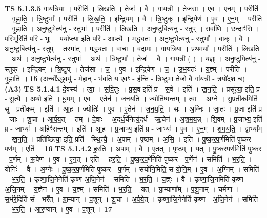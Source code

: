 \documentclass[17pt]{extarticle}
\begin{document}
                  \newline
                                \textbf{ TS 5.1.3.5} \newline
                  गा॒य॒त्रि॒या । परीति॑ । लि॒ख॒ति॒ । तेजः॑ । वै । गा॒य॒त्री । तेज॑सा । ए॒व । ए॒न॒म् । परीति॑ । गृ॒ह्णा॒ति॒ । त्रि॒ष्टुभा᳚ । परीति॑ । लि॒ख॒ति॒ । इ॒न्द्रि॒यम् । वै । त्रि॒ष्टुक् । इ॒न्द्रि॒येण॑ । ए॒व । ए॒न॒म् । परीति॑ । गृ॒ह्णा॒ति॒ । अ॒नु॒ष्टुभेत्य॑नु - स्तुभा᳚ । परीति॑ । लि॒ख॒ति॒ । अ॒नु॒ष्टुबित्य॑नु - स्तुप् । सर्वा॑णि । छन्दाꣳ॑सि । प॒रि॒भूरिति॑ परि - भूः । पर्या᳚प्त्या॒ इति॒ परि॑ - आ॒प्त्यै॒ । म॒द्ध्य॒तः । अ॒नु॒ष्टुभेत्य॑नु - स्तुभा᳚ । वाक् । वै । अ॒नु॒ष्टुबित्य॑नु - स्तुप् । तस्मा᳚त् । म॒द्ध्य॒तः । वा॒चा । व॒दा॒मः॒ । गा॒य॒त्रि॒या । प्र॒थ॒मया᳚ । परीति॑ । लि॒ख॒ति॒ । अथ॑ । अ॒नु॒ष्टुभेत्य॑नु - स्तुभा᳚ । अथ॑ । त्रि॒ष्टुभा᳚ । तेजः॑ । वै । गा॒य॒त्री ( ) । य॒ज्ञ्ः । अ॒नु॒ष्टुगित्य॑नु - स्तुक् । इ॒न्द्रि॒यम् । त्रि॒ष्टुप् । तेज॑सा । च॒ । ए॒व । इ॒न्द्रि॒येण॑ । च॒ । उ॒भ॒यतः॑ । य॒ज्ञ्म् । परीति॑ । गृ॒ह्णा॒ति॒ ॥ \textbf{  15 } \newline
                  \newline
                      (अ॒न्धो᳚ऽद्ध्व॒र्यु - र्म॒हान् - भ॑वति॒ य ए॒वꣳ - ह॑न्ति - त्रि॒ष्टुभा॒ तेजो॒ वै गा॑य॒त्री - त्रयो॑दश च)  \textbf{(A3)} \newline \newline
                                \textbf{ TS 5.1.4.1} \newline
                  दे॒वस्य॑ । त्वा॒ । स॒वि॒तुः । प्र॒स॒व इति॑ प्र - स॒वे । इति॑ । ख॒न॒ति॒ । प्रसू᳚त्या॒ इति॒ प्र - सू॒त्यै॒ । अथो॒ इति॑ । धू॒मम् । ए॒व । ए॒तेन॑ । ज॒न॒य॒ति॒ । ज्योति॑ष्मन्तम् । त्वा॒ । अ॒ग्ने॒ । सु॒प्रती॑क॒मिति॑ सु - प्रती॑कम् । इति॑ । आ॒ह॒ । ज्योतिः॑ । ए॒व । ए॒तेन॑ । ज॒न॒य॒ति॒ । सः । अ॒ग्निः । जा॒तः । प्र॒जा इति॑ प्र - जाः । शु॒चा । आ॒र्प॒य॒त् । तम् । दे॒वाः । अ॒द्‌र्ध॒र्चेनेत्य॒॑द्‌र्ध - ऋ॒चेन॑ । अ॒श॒म॒य॒न्न् । शि॒वम् । प्र॒जाभ्य॒ इति॑ प्र - जाभ्यः॑ । अहिꣳ॑सन्तम् । इति॑ । आ॒ह॒ । प्र॒जाभ्य॒ इति॑ प्र - जाभ्यः॑ । ए॒व । ए॒न॒म् । श॒म॒य॒ति॒ । द्वाभ्या᳚म् । ख॒न॒ति॒ । प्रति॑ष्ठित्या॒ इति॒ प्रति॑ - स्थि॒त्यै॒ । अ॒पाम् । पृ॒ष्ठम् । अ॒सि॒ । इति॑ । पु॒ष्क॒र॒प॒र्णमिति॑ पुष्कर - प॒र्णम् । एति॑ । \textbf{  16} \newline
                  \newline
                                \textbf{ TS 5.1.4.2} \newline
                  ह॒र॒ति॒ । अ॒पाम् । वै । ए॒तत् । पृ॒ष्ठम् । यत् । पु॒ष्क॒र॒प॒र्णमिति॑ पुष्कर - प॒र्णम् । रू॒पेण॑ । ए॒व । ए॒न॒त् । एति॑ । ह॒र॒ति॒ । पु॒ष्क॒र॒प॒र्णेनेति॑ पुष्कर - प॒र्णेन॑ । समिति॑ । भ॒र॒ति॒ । योनिः॑ । वै । अ॒ग्नेः । पु॒ष्क॒र॒प॒र्णमिति॑ पुष्कर - प॒र्णम् । सयो॑नि॒मिति॒ स-यो॒नि॒म् । ए॒व । अ॒ग्निम् । समिति॑ । भ॒र॒ति॒ । कृ॒ष्णा॒जि॒नेनेति॑ कृष्ण-अ॒जि॒नेन॑ । समिति॑ । भ॒र॒ति॒ । य॒ज्ञ्ः । वै । कृ॒ष्णा॒जि॒नमिति॑ कृष्ण - अ॒जि॒नम् । य॒ज्ञेन॑ । ए॒व । य॒ज्ञ्म् । समिति॑ । भ॒र॒ति॒ । यत् । ग्रा॒म्याणा᳚म् । प॒शू॒नाम् । चर्म॑णा । स॒भंरे॒दिति॑ सं - भरे᳚त् । ग्रा॒म्यान् । प॒शून् । शु॒चा । अ॒र्प॒ये॒त् । कृ॒ष्णा॒जि॒नेनेति॑ कृष्ण - अ॒जि॒नेन॑ । समिति॑ । भ॒र॒ति॒ । आ॒र॒ण्यान् । ए॒व । प॒शून् । \textbf{  17} \newline
\end{document}
